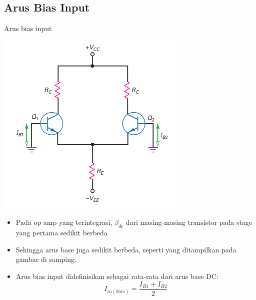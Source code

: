 \documentclass[aspectratio=169]{beamer}
\begin{document}
\subsection{Arus Bias Input}
\begin{frame}{Arus bias input}
	\begin{multicols}{2}
		\begin{center}
			\includegraphics[height=0.7\textheight]{gambar/01.diff-amp/01.different_base_currents}
		\end{center}
		\columnbreak
		\begin{itemize}
			\item Pada op amp yang terintegrasi, $ \beta_{dc} $ dari masing-masing transistor pada stage yang pertama sedikit berbeda
			\item Sehingga arus base juga sedikit berbeda, seperti yang ditampilkan pada gambar di samping.
			\item Arus bias input didefinisikan sebagai rata-rata dari arus base DC:
			\begin{equation}
				I_{in(bias)} = \frac{I_{B1} + I_{B2}}{2}
			\end{equation}
		\end{itemize}
	\end{multicols}
\end{frame}
\end{document}

